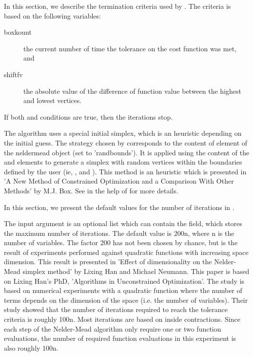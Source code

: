 \begin{Details}\relax
{}

In this section, we describe the termination criteria used by .
The criteria is based on the following variables: \begin{description}

\item[boxkount] the current number of time the tolerance on the cost 
function was met, and
\item[shiftfv] the absolute value of the difference of function value
between the highest and lowest vertices.

\end{description}


If both  and  
conditions are true, then the iterations stop.


The  algorithm uses a special initial simplex, which is an
heuristic depending on the initial guess. The strategy chosen by
 corresponds to the content of 
element of the neldermead object (set to 'randbounds'). It is applied using 
the content of the  and  elements to generate
a simplex with random vertices within the boundaries defined by the user (ie,
, and ). This method is an heuristic which is presented 
in 'A New Method of Constrained Optimization and a Comparison With Other 
Methods' by M.J. Box. See in the help of  for more details.


In this section, we present the default values for the number of iterations in
.

The  input argument is an optional list which can
contain the  field, which stores the maximum number of
iterations. The default value is 200n, where n is the number of variables.
The factor 200 has not been chosen by chance, but is the result of experiments
performed against quadratic functions with increasing space dimension.
This result is presented in 'Effect of dimensionality on the Nelder-Mead
simplex method' by Lixing Han and Michael Neumann. This paper is based on
Lixing Han's  PhD, 'Algorithms in Unconstrained Optimization'. The study is
based on numerical experiments with a quadratic function where the number of
terms depends on the dimension of the space (i.e. the number of variables).
Their study showed that the number of iterations required to reach the
tolerance criteria is roughly 100n. Most iterations are based on inside
contractions. Since each step of the Nelder-Mead algorithm only require one
or two function evaluations, the number of required function evaluations in
this experiment is also roughly 100n.


\end{Details}

